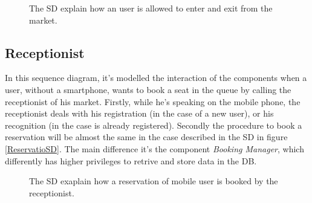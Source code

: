 \begin{figure}[H]
  \label{EntryExitSD}
  \centering
    \caption{The SD explain how an user is allowed to enter and exit from the market.}
\end{figure} 

\pagebreak

\subsection{Receptionist}
In this sequence diagram, it's modelled the interaction of the components when a user, without a smartphone, wants to book a seat in the queue by calling the receptionist of his market. Firstly, while he's speaking on the mobile phone, the receptionist deals with his registration (in the case of a new user), or his recognition (in the case is already registered).
Secondly the procedure to book a reservation will be almost the same in the case described in the SD in figure \ref{ReservatioSD}. The main difference it's the component \textit{Booking Manager}, which differently has higher privileges to retrive and store data in the DB.

\begin{figure}[H]
  \label{MobileUserSD}
  \centering
    \caption{The SD exaplain how a reservation of mobile user is booked by the receptionist.}
\end{figure} 

